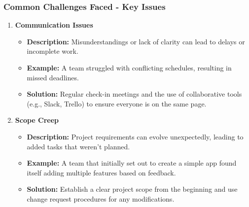 \documentclass[aspectratio=169]{beamer}
\begin{document}
\begin{frame}[fragile]
    \frametitle{Common Challenges Faced - Key Issues}
    \begin{enumerate}
        \item \textbf{Communication Issues}
            \begin{itemize}
                \item \textbf{Description:} Misunderstandings or lack of clarity can lead to delays or incomplete work.
                \item \textbf{Example:} A team struggled with conflicting schedules, resulting in missed deadlines.
                \item \textbf{Solution:} Regular check-in meetings and the use of collaborative tools (e.g., Slack, Trello) to ensure everyone is on the same page.
            \end{itemize}
        \item \textbf{Scope Creep}
            \begin{itemize}
                \item \textbf{Description:} Project requirements can evolve unexpectedly, leading to added tasks that weren't planned.
                \item \textbf{Example:} A team that initially set out to create a simple app found itself adding multiple features based on feedback.
                \item \textbf{Solution:} Establish a clear project scope from the beginning and use change request procedures for any modifications.
            \end{itemize}
    \end{enumerate}
\end{frame}
\end{document}
